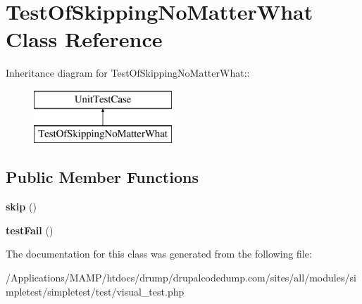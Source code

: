\hypertarget{class_test_of_skipping_no_matter_what}{
\section{TestOfSkippingNoMatterWhat Class Reference}
\label{class_test_of_skipping_no_matter_what}
}
Inheritance diagram for TestOfSkippingNoMatterWhat::\begin{figure}[H]
\begin{center}
\leavevmode
\includegraphics[height=2cm]{class_test_of_skipping_no_matter_what}
\end{center}
\end{figure}
\subsection*{Public Member Functions}
\begin{DoxyCompactItemize}
\item 
\hypertarget{class_test_of_skipping_no_matter_what_a0aa483d48faf5c8c6c07bce4098c408e}{
{\bfseries skip} ()}
\label{class_test_of_skipping_no_matter_what_a0aa483d48faf5c8c6c07bce4098c408e}

\item 
\hypertarget{class_test_of_skipping_no_matter_what_a72b5e3d6fe2f0523600f6d1df1c577e4}{
{\bfseries testFail} ()}
\label{class_test_of_skipping_no_matter_what_a72b5e3d6fe2f0523600f6d1df1c577e4}

\end{DoxyCompactItemize}


The documentation for this class was generated from the following file:\begin{DoxyCompactItemize}
\item 
/Applications/MAMP/htdocs/drump/drupalcodedump.com/sites/all/modules/simpletest/simpletest/test/visual\_\-test.php\end{DoxyCompactItemize}
